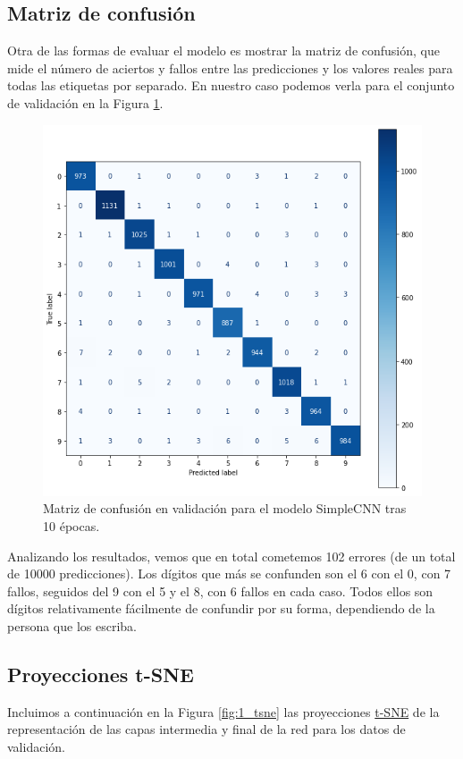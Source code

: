 \documentclass[11pt]{article}
\begin{document}
\subsection*{Matriz de confusión}

Otra de las formas de evaluar el modelo es mostrar la matriz de confusión, que mide el número de aciertos y fallos entre las predicciones y los valores reales para todas las etiquetas por separado. En nuestro caso podemos verla para el conjunto de validación en la Figura \ref{fig:1_confusion_matrix}.

\begin{figure}[h!]
  \centering
  \includegraphics[width=.5\textwidth]{img/1_confusion_matrix}
  \caption{Matriz de confusión en validación para el modelo SimpleCNN tras 10 épocas.}
  \label{fig:1_confusion_matrix}
\end{figure}

Analizando los resultados, vemos que en total cometemos 102 errores (de un total de 10000 predicciones). Los dígitos que más se confunden son el 6 con el 0, con 7 fallos, seguidos del 9 con el 5 y el 8, con 6 fallos en cada caso. Todos ellos son dígitos relativamente fácilmente de confundir por su forma, dependiendo de la persona que los escriba.

\subsection*{Proyecciones t-SNE}

Incluimos a continuación en la Figura \ref{fig:1_tsne} las proyecciones \href{https://scikit-learn.org/stable/modules/generated/sklearn.manifold.TSNE.html}{t-SNE} de la representación de las capas intermedia y final de la red para los datos de validación.
\end{document}
